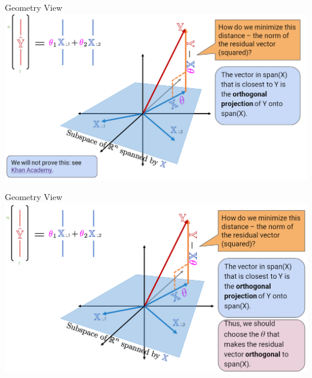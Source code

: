\documentclass[aspectratio=169]{../latex_main/tntbeamer}  %
\begin{document}
	
	\begin{frame}{Geometry View}
	    \centering
	    \includegraphics[scale=.32]{Bild9}
	\end{frame}
	
	\begin{frame}{Geometry View}
	    \centering
	    \includegraphics[scale=.32]{Bild10}
	\end{frame}
	
	
	
\end{document}
